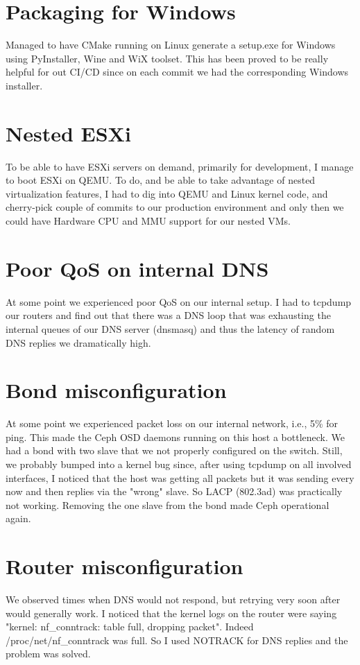 \documentclass[margin,centered]{res}
\begin{document}
\begin{resume}
\section{\sc Packaging for Windows}
Managed to have CMake running on Linux generate a setup.exe for Windows using
PyInstaller, Wine and WiX toolset. This has been proved to be really helpful for
out CI/CD since on each commit we had the corresponding Windows installer.

\section{\sc Nested ESXi}
To be able to have ESXi servers on demand, primarily for development, I manage
to boot ESXi on QEMU. To do, and be able to take advantage of nested
virtualization features, I had to dig into QEMU and Linux kernel code, and
cherry-pick couple of commits to our production environment and only then we
could have Hardware CPU and MMU support for our nested VMs.

\section{\sc Poor QoS on internal DNS}
At some point we experienced poor QoS on our internal setup. I had to tcpdump
our routers and find out that there was a DNS loop that was exhausting the
internal queues of our DNS server (dnsmasq) and thus the latency of random
DNS replies we dramatically high.

\section{\sc Bond misconfiguration}
At some point we experienced packet loss on our internal network, i.e., 5\% for
ping. This made the Ceph OSD daemons running on this host a bottleneck. We had
a bond with two slave that we not properly configured on the switch. Still, we
probably bumped into a kernel bug since, after using tcpdump on all involved
interfaces, I noticed that the host was getting all packets but it was sending
every now and then replies via the "wrong" slave. So LACP (802.3ad) was
practically not working. Removing the one slave from the bond made Ceph
operational again.

\section{\sc Router misconfiguration}
We observed times when DNS would not respond, but retrying very soon after
would generally work. I noticed that the kernel logs on the router were
saying "kernel: nf\_conntrack: table full, dropping packet". Indeed
/proc/net/nf\_conntrack was full. So I used NOTRACK for DNS replies and the
problem was solved.


\end{resume}
\end{document}
